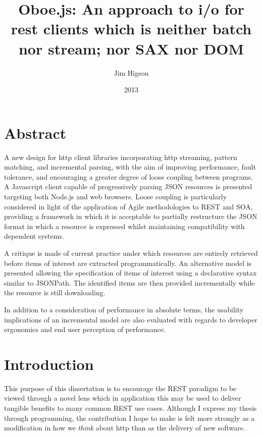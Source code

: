 \documentclass[]{article}
\title{Oboe.js: An approach to i/o for rest clients which is neither batch nor
       stream; nor SAX nor DOM}
\author{Jim Higson}
\date{2013}
\let\stdsection\section
\renewcommand\section{\newpage\stdsection}
\begin{document}
\maketitle


{
\clearpage
\hypersetup{linkcolor=black}
\setcounter{tocdepth}{3}
\tableofcontents
}

\clearpage
\listoffigures

\clearpage

\section{Abstract}

A new design for http client libraries incorporating http streaming,
pattern matching, and incremental parsing, with the aim of improving
performance, fault tolerance, and encouraging a greater degree of loose
coupling between programs. A Javascript client capable of progressively
parsing JSON resources is presented targeting both Node.js and web
browsers. Loose coupling is particularly considered in light of the
application of Agile methodologies to REST and SOA, providing a
framework in which it is acceptable to partially restructure the JSON
format in which a resource is expressed whilst maintaining compatibility
with dependent systems.

A critique is made of current practice under which resources are
entirely retrieved before items of interest are extracted
programmatically. An alternative model is presented allowing the
specification of items of interest using a declarative syntax similar to
JSONPath. The identified items are then provided incrementally while the
resource is still downloading.

In addition to a consideration of performance in absolute terms, the
usability implications of an incremental model are also evaluated with
regards to developer ergonomics and end user perception of performance.

\section{Introduction}

This purpose of this dissertation is to encourage the REST paradigm to
be viewed through a novel lens which in application this may be used to
deliver tangible benefits to many common REST use cases. Although I
express my thesis through programming, the contribution I hope to make
is felt more strongly as a modification in how we \emph{think} about
http than as the delivery of new software.
\end{document}
